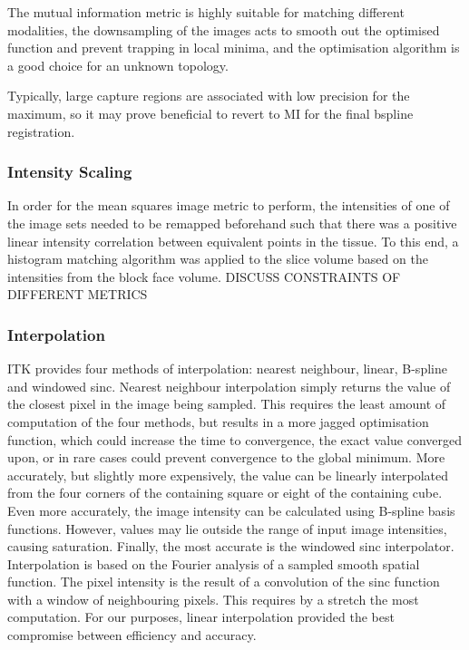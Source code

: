       The mutual information metric is highly suitable for matching different modalities, the downsampling of the images acts to smooth out the optimised function and prevent trapping in local minima, and the optimisation algorithm is a good choice for an unknown topology. 
      
      
      Typically, large capture regions are associated with low precision for the maximum, so it may prove beneficial to revert to MI for the final bspline registration.
    
    \subsubsection{Intensity Scaling} %
    \label{ssub:intensity_scaling}
      In order for the mean squares image metric to perform, the intensities of one of the image sets needed to be remapped beforehand such that there was a positive linear intensity correlation between equivalent points in the tissue. To this end, a histogram matching algorithm was applied to the slice volume based on the intensities from the block face volume. DISCUSS CONSTRAINTS OF DIFFERENT METRICS
    
    \subsubsection{Interpolation} %
    \label{ssub:interpolation}
      ITK provides four methods of interpolation: nearest neighbour, linear, B-spline and windowed sinc. Nearest neighbour interpolation simply returns the value of the closest pixel in the image being sampled. This requires the least amount of computation of the four methods, but results in a more jagged optimisation function, which could increase the time to convergence, the exact value converged upon, or in rare cases could prevent convergence to the global minimum. More accurately, but slightly more expensively, the value can be linearly interpolated from the four corners of the containing square or eight of the containing cube. Even more accurately, the image intensity can be calculated using B-spline basis functions. However, values may lie outside the range of input image intensities, causing saturation. Finally, the most accurate is the windowed sinc interpolator. Interpolation is based on the Fourier analysis of a sampled smooth spatial function. The pixel intensity is the result of a convolution of the sinc function with a window of neighbouring pixels. This requires by a stretch the most computation. For our purposes, linear interpolation provided the best compromise between efficiency and accuracy.
    
